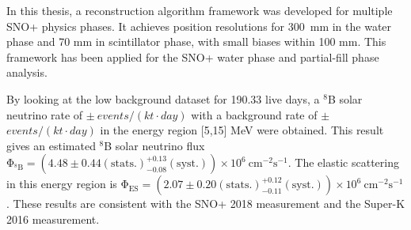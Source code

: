 In this thesis, a reconstruction algorithm framework was developed for multiple SNO+ physics phases. It achieves position resolutions for 300~mm in the water phase and 70 mm in scintillator phase, with small biases within 100 mm. This framework has been applied for the SNO+ water phase and partial-fill phase analysis. 

By looking at the low background dataset for 190.33 live days, a $^8$B solar neutrino rate of $ \pm~events/(kt\cdot day)$ with a background rate of $ \pm $ $events/(kt\cdot day)$ in the energy region [5,15] MeV were obtained. This result gives an estimated $^8$B solar neutrino flux $\mathrm{\Phi_{^8B}=(4.48 \pm 0.44(stats.)^{+0.13}_{-0.08}(syst.))\times10^6~cm^{-2}s^{-1}}$. The elastic scattering in this energy region is $\mathrm{\Phi_{ES}=(2.07 \pm 0.20(stats.)^{+0.12}_{-0.11}(syst.))\times10^6~cm^{-2}s^{-1}}$. These results are consistent with the SNO+ 2018 measurement\cite{anderson2019measurement} and the Super-K 2016 measurement\cite{abe2016solar}.